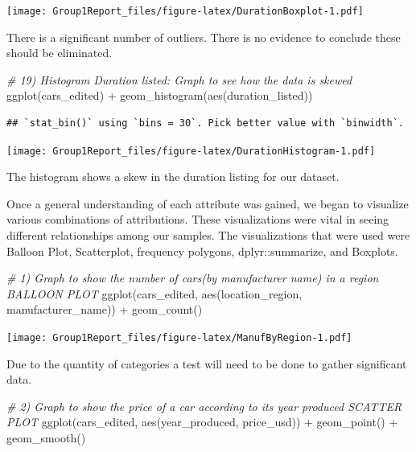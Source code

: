 \documentclass[
]{article}
\newenvironment{Shaded}{\begin{snugshade}}{\end{snugshade}}
\newcommand{\CommentTok}[1]{\textcolor[rgb]{0.56,0.35,0.01}{\textit{#1}}}
\newcommand{\FunctionTok}[1]{\textcolor[rgb]{0.00,0.00,0.00}{#1}}
\newcommand{\NormalTok}[1]{#1}
\newcommand{\SpecialCharTok}[1]{\textcolor[rgb]{0.00,0.00,0.00}{#1}}
\begin{document}
\texttt{[image: Group1Report\_files/figure-latex/DurationBoxplot-1.pdf]}

There is a significant number of outliers. There is no evidence to
conclude these should be eliminated.

\begin{Shaded}
\begin{Highlighting}[]
\CommentTok{\# 19) Histogram Duration listed: Graph to see how the data is skewed}
\FunctionTok{ggplot}\NormalTok{(cars\_edited) }\SpecialCharTok{+} \FunctionTok{geom\_histogram}\NormalTok{(}\FunctionTok{aes}\NormalTok{(duration\_listed))}
\end{Highlighting}
\end{Shaded}

\begin{verbatim}
## `stat_bin()` using `bins = 30`. Pick better value with `binwidth`.
\end{verbatim}

\texttt{[image: Group1Report\_files/figure-latex/DurationHistogram-1.pdf]}

The histogram shows a skew in the duration listing for our dataset.

Once a general understanding of each attribute was gained, we began to
visualize various combinations of attributions. These visualizations
were vital in seeing different relationships among our samples. The
visualizations that were used were Balloon Plot, Scatterplot, frequency
polygons, dplyr::summarize, and Boxplots.

\begin{Shaded}
\begin{Highlighting}[]
\CommentTok{\# 1) Graph to show the number of cars(by manufacturer name) in a region BALLOON PLOT}
\FunctionTok{ggplot}\NormalTok{(cars\_edited, }\FunctionTok{aes}\NormalTok{(location\_region, manufacturer\_name)) }\SpecialCharTok{+} \FunctionTok{geom\_count}\NormalTok{()}
\end{Highlighting}
\end{Shaded}

\texttt{[image: Group1Report\_files/figure-latex/ManufByRegion-1.pdf]}

Due to the quantity of categories a test will need to be done to gather
significant data.

\begin{Shaded}
\begin{Highlighting}[]
\CommentTok{\# 2) Graph to show the price of a car according to its year produced SCATTER PLOT}
\FunctionTok{ggplot}\NormalTok{(cars\_edited, }\FunctionTok{aes}\NormalTok{(year\_produced, price\_usd)) }\SpecialCharTok{+} \FunctionTok{geom\_point}\NormalTok{() }\SpecialCharTok{+} \FunctionTok{geom\_smooth}\NormalTok{()}
\end{Highlighting}
\end{Shaded}
\end{document}
